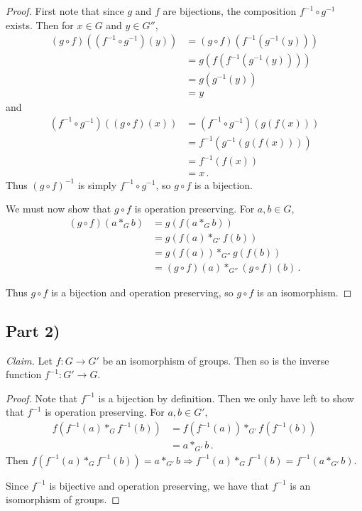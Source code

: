 \documentclass{abrice}
\newcommand{\Claim}{\noindent\emph{Claim.}\xspace}%
\begin{document}
\begin{proof}
  First note that since $g$ and $f$ are bijections, the composition $f^{-1}
  \circ g^{-1}$ exists. Then for $x \in G$ and $y \in G''$,
  \begin{align*}
    (g \circ f)((f^{-1} \circ g^{-1})(y))
    &= (g \circ f)(f^{-1}(g^{-1}(y))) \\
    &= g(f(f^{-1}(g^{-1}(y)))) \\
    &= g(g^{-1}(y)) \\
    &= y
  \end{align*}
  and
  \begin{align*}
    (f^{-1} \circ g^{-1})((g \circ f)(x))
    &= (f^{-1} \circ g^{-1})(g(f(x))) \\
    &= f^{-1}(g^{-1}(g(f(x)))) \\
    &= f^{-1}(f(x)) \\
    &= x\, .
  \end{align*}
  Thus ${(g \circ f)}^{-1}$ is simply $f^{-1} \circ g^{-1}$, so $g \circ f$ is a
  bijection.

  We must now show that $g \circ f$ is operation preserving. For $a,b \in G$,
  \begin{align*}
    (g \circ f) (a *_G b)
    &= g(f(a *_G b)) \\
    &= g(f(a) *_{G'} f(b)) \\
    &= g(f(a)) *_{G''} g(f(b)) \\
    &= (g \circ f)(a) *_{G''} (g \circ f)(b)\, .
  \end{align*}

  Thus $g \circ f$ is a bijection and operation preserving, so $g \circ f$ is an
  isomorphism.
\end{proof}

\subsection{Part 2)}

\Claim Let $f : G \to G'$ be an isomorphism of groups. Then so is the inverse
function $f^{-1} : G' \to G$.

\begin{proof}
  Note that $f^{-1}$ is a bijection by definition. Then we only have left to
  show that $f^{-1}$ is operation preserving. For $a,b \in G'$,
  \begin{align*}
    f(f^{-1}(a) *_{G} f^{-1}(b))
    &= f(f^{-1}(a)) *_{G'} f(f^{-1}(b)) \\
    &= a *_{G'} b\, .
  \end{align*}
  Then $f(f^{-1}(a) *_{G} f^{-1}(b)) = a *_{G'} b \Rightarrow f^{-1}(a)
  *_{G} f^{-1}(b) = f^{-1}(a *_{G'} b)$.

  Since $f^{-1}$ is bijective and operation preserving, we have that $f^{-1}$ is
  an isomorphism of groups.
\end{proof}
\end{document}
